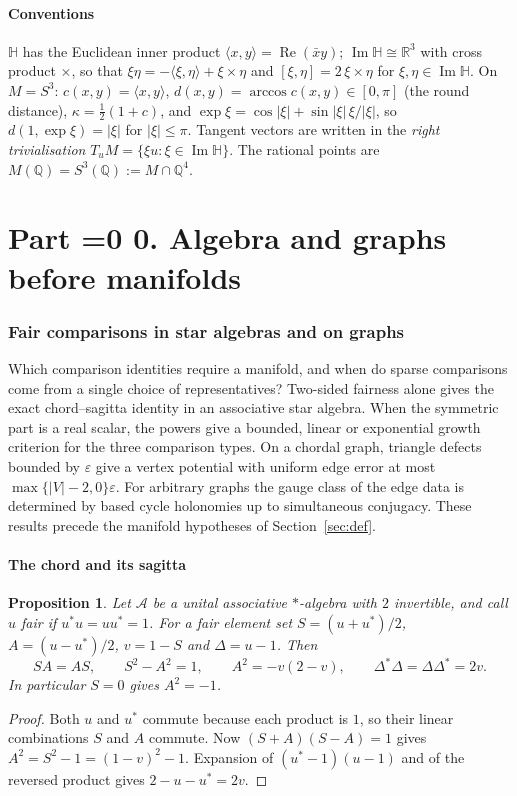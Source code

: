 \documentclass[11pt,reqno]{amsart}
\newtheorem{proposition}[theorem]{Proposition}
\theoremstyle{definition}
\theoremstyle{remark}
\numberwithin{equation}{section}
\newcommand{\R}{\mathbb{R}}
\newcommand{\HH}{\mathbb{H}}
\newcommand{\Q}{\mathbb{Q}}
\newcommand{\re}{\operatorname{Re}}
\newcommand{\im}{\operatorname{Im}}
\newcommand{\ip}[2]{\langle #1,#2\rangle}
\newcounter{ppart}
\renewcommand{\theppart}{\ifnum\value{ppart}=0 0\else\Roman{ppart}\fi}
\newcommand{\paperpart}[2]{\refstepcounter{ppart}\part*{Part \theppart. #2}\label{#1}}
\begin{document}
\subsection{Conventions}
$\HH$ has the Euclidean inner product $\ip xy=\re(\bar xy)$; $\im\HH\cong\R^3$ with cross product
$\times$, so that $\xi\eta=-\ip\xi\eta+\xi\times\eta$ and $[\xi,\eta]=2\,\xi\times\eta$ for
$\xi,\eta\in\im\HH$.  On $M=S^3$: $c(x,y)=\ip xy$, $d(x,y)=\arccos c(x,y)\in[0,\pi]$ (the round
distance), $\kappa=\tfrac12(1+c)$, and $\exp\xi=\cos\lvert\xi\rvert+\sin\lvert\xi\rvert\,\xi/\lvert\xi\rvert$,
so $d(1,\exp\xi)=\lvert\xi\rvert$ for $\lvert\xi\rvert\le\pi$.  Tangent vectors are written in the
\emph{right trivialisation} $T_uM=\{\xi u:\xi\in\im\HH\}$.  The rational points are $M(\Q)=S^3(\Q):=M\cap\Q^4$.

\setcounter{ppart}{-1}
\paperpart{part:alg}{Algebra and graphs before manifolds}

\setcounter{section}{-1}
\section{Fair comparisons in star algebras and on graphs}
\label{sec:m1}\label{m1:section}

Which comparison identities require a manifold, and when do sparse comparisons
come from a single choice of representatives? Two-sided fairness alone gives
the exact chord--sagitta identity in an associative star algebra. When the
symmetric part is a real scalar, the powers give a bounded, linear or
exponential growth criterion for the three comparison types. On a chordal
graph, triangle defects bounded by \(\varepsilon\) give a vertex potential with
uniform edge error at most \(\max\{|V|-2,0\}\varepsilon\). For arbitrary graphs
the gauge class of the edge data is determined by based cycle holonomies up
to simultaneous conjugacy. These results precede the manifold hypotheses of
Section~\ref{sec:def}.

\subsection{The chord and its sagitta}

\begin{proposition}\label{m1:algebra}
Let \(\mathcal A\) be a unital associative \(*\)-algebra with \(2\)
invertible, and call \(u\) \emph{fair} if \(u^*u=uu^*=1\).
For a fair element set \(S=(u+u^*)/2\), \(A=(u-u^*)/2\),
\(v=1-S\) and \(\Delta=u-1\). Then
\begin{equation}\label{m1:chord-eq}
 SA=AS,\qquad S^2-A^2=1,\qquad
 A^2=-v(2-v),\qquad \Delta^*\Delta=\Delta\Delta^*=2v .
\end{equation}
In particular \(S=0\) gives \(A^2=-1\).
\end{proposition}
\begin{proof}
Both \(u\) and \(u^*\) commute because each product is \(1\), so their
linear combinations \(S\) and \(A\) commute. Now
\((S+A)(S-A)=1\) gives \(A^2=S^2-1=(1-v)^2-1\).
Expansion of \((u^*-1)(u-1)\) and of the reversed product gives
\(2-u-u^*=2v\).
\end{proof}
\end{document}
